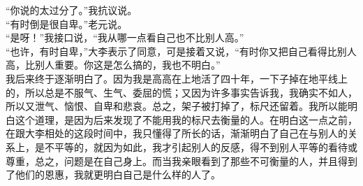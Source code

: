 “你说的太过分了。”我抗议说。\\

“有时倒是很自卑。”老元说。\\

“是呀！”我接口说，“我从哪一点看自己也不比别人高。”\\

“也许，有时自卑，”大李表示了同意，可是接着又说，“有时你又把自己看得比别人高，比别人重要。你这是怎么搞的，我也不明白。”\\

我后来终于逐渐明白了。因为我是高高在上地活了四十年，一下子掉在地平线上的，所以总是不服气、生气、委屈的慌；又因为许多事实告诉我，我确实不如人，所以又泄气、恼恨、自卑和悲哀。总之，架子被打掉了，标尺还留着。我所以能明白这个道理，是因为后来发现了不能用我的标尺去衡量的人。在明白这一点之前，在跟大李相处的这段时间中，我只懂得了所长的话，渐渐明白了自己在与别人的关系上，是不平等的，就因为如此，我才引起别人的反感，得不到别人平等的看待或尊重，总之，问题是在自己身上。而当我亲眼看到了那些不可衡量的人，并且得到了他们的恩惠，我就更明白自己是什么样的人了。
